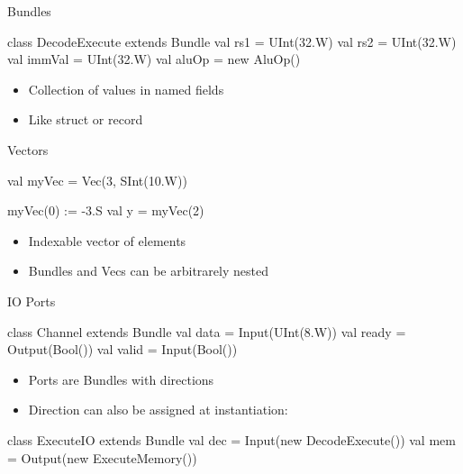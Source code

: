 \begin{frame}[fragile]{Bundles}
\begin{chisel}
class DecodeExecute extends Bundle {
  val rs1 = UInt(32.W)
  val rs2 = UInt(32.W)
  val immVal = UInt(32.W)
  val aluOp = new AluOp()
}
\end{chisel}
\begin{itemize}
\item Collection of values in named fields 
\item Like struct or record
\end{itemize}
\end{frame}

\begin{frame}[fragile]{Vectors}
\begin{chisel}
val myVec = Vec(3, SInt(10.W))

myVec(0) := -3.S
val y = myVec(2)
\end{chisel}
\begin{itemize}
\item Indexable vector of elements
\item Bundles and Vecs can be arbitrarely nested
\end{itemize}
\end{frame}

\begin{frame}[fragile]{IO Ports}
\begin{chisel}
class Channel extends Bundle {
  val data = Input(UInt(8.W))
  val ready = Output(Bool())
  val valid = Input(Bool())
}
\end{chisel}
\begin{itemize}
\item Ports are Bundles with directions
\item Direction can also be assigned at instantiation:
\end{itemize}
\begin{chisel}
class ExecuteIO extends Bundle {
  val dec = Input(new DecodeExecute())
  val mem = Output(new ExecuteMemory())
}
\end{chisel}
\end{frame}

%

